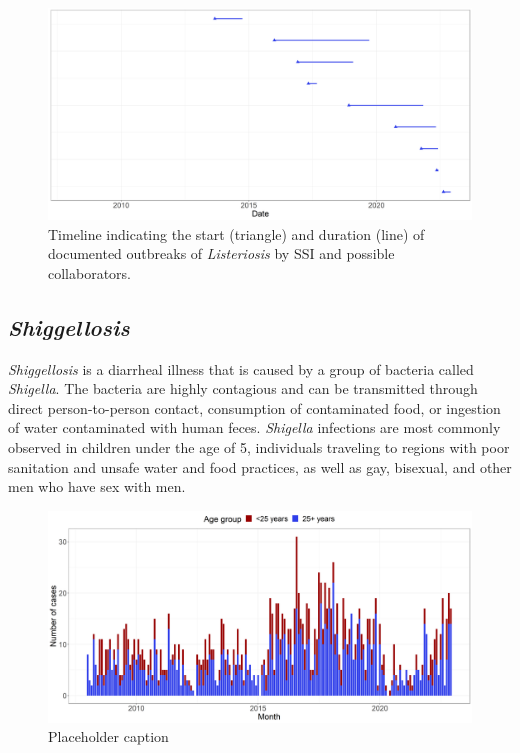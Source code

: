 \documentclass[a4paper,twoside,11pt]{report} %
\theoremstyle{definition}
\theoremstyle{definition}
\theoremstyle{definition}
\theoremstyle{definition}
\theoremstyle{remark}
\begin{document}
\begin{figure}[H]
\includegraphics[width=1\linewidth]{../figures/LIST_SSI_outbreaks} \caption{Timeline indicating the start (triangle) and duration (line) of documented outbreaks of \textit{Listeriosis} by SSI and possible collaborators.}\label{fig:LISTSSIoutbreaks}
\end{figure}

\subsection{\textit{Shiggellosis}}

\textit{Shiggellosis} is a diarrheal illness that is caused by a group of bacteria called \textit{Shigella}. The bacteria are highly contagious and can be transmitted through direct person-to-person contact, consumption of contaminated food, or ingestion of water contaminated with human feces. \textit{Shigella} infections are most commonly observed in children under the age of 5, individuals traveling to regions with poor sanitation and unsafe water and food practices, as well as gay, bisexual, and other men who have sex with men.



\begin{figure}[H]
\includegraphics[width=1\linewidth]{../figures/SHIG_long_plot} \caption{Placeholder caption}\label{fig:SHIGLongPlot}
\end{figure}
\end{document}

